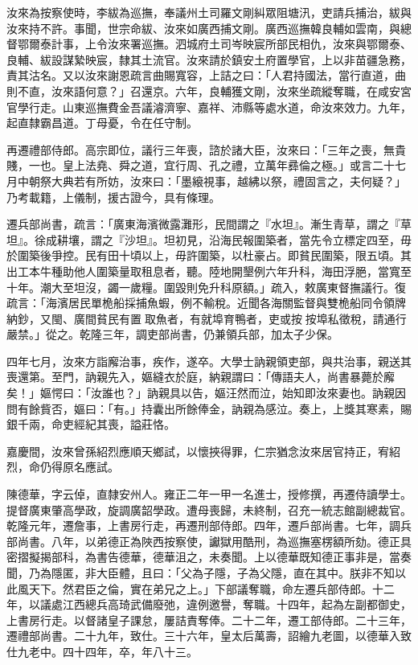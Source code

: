\begin{pinyinscope}
汝來為按察使時，李紱為巡撫，奉議州土司羅文剛糾眾阻塘汛，吏請兵捕治，紱與汝來持不許。事聞，世宗命紱、汝來如廣西捕文剛。廣西巡撫韓良輔如雲南，與總督鄂爾泰計事，上令汝來署巡撫。泗城府土司岑映宸所部民相仇，汝來與鄂爾泰、良輔、紱設謀縶映宸，隸其土流官。汝來請於鎮安土府置學官，上以非苗疆急務，責其沽名。又以汝來謝恩疏言曲賜寬容，上詰之曰：「人君持國法，當行直道，曲則不直，汝來語何意？」召還京。六年，良輔獲文剛，汝來坐疏縱奪職，在咸安宮官學行走。山東巡撫費金吾議濬濟寧、嘉祥、沛縣等處水道，命汝來效力。九年，起直隸霸昌道。丁母憂，令在任守制。

再遷禮部侍郎。高宗即位，議行三年喪，諮於諸大臣，汝來曰：「三年之喪，無貴賤，一也。皇上法堯、舜之道，宜行周、孔之禮，立萬年彞倫之極。」或言二十七月中朝祭大典若有所妨，汝來曰：「墨縗視事，越紼以祭，禮固言之，夫何疑？」乃考載籍，上儀制，援古證今，具有條理。

遷兵部尚書，疏言：「廣東海濱微露灘形，民間謂之『水坦』。漸生青草，謂之『草坦』。徐成耕壤，謂之『沙坦』。坦初見，沿海民報圍築者，當先令立標定四至，毋於圍築後爭控。民有田十頃以上，毋許圍築，以杜豪占。即貧民圍築，限五頃。其出工本牛種助他人圍築量取租息者，聽。陸地開墾例六年升科，海田浮脃，當寬至十年。潮大至坦沒，蠲一歲糧。圍毀則免升科原額。」疏入，敕廣東督撫議行。復疏言：「海濱居民單桅船採捕魚蝦，例不輸稅。近聞各海關監督與雙桅船同令領牌納鈔，又閩、廣間貧民有置𥭋取魚者，有就埠育鴨者，吏或按𥭋按埠私徵稅，請通行嚴禁。」從之。乾隆三年，調吏部尚書，仍兼領兵部，加太子少保。

四年七月，汝來方詣廨治事，疾作，遂卒。大學士訥親領吏部，與共治事，親送其喪還第。至門，訥親先入，嫗縫衣於庭，納親謂曰：「傳語夫人，尚書暴薨於廨矣！」嫗愕曰：「汝誰也？」訥親具以告，嫗汪然而泣，始知即汝來妻也。訥親因問有餘貲否，嫗曰：「有。」持囊出所餘俸金，訥親為感泣。奏上，上獎其寒素，賜銀千兩，命吏經紀其喪，謚莊恪。

嘉慶間，汝來曾孫紹烈應順天鄉試，以懷挾得罪，仁宗猶念汝來居官持正，宥紹烈，命仍得原名應試。

陳德華，字云倬，直隸安州人。雍正二年一甲一名進士，授修撰，再遷侍讀學士。提督廣東肇高學政，旋調廣韶學政。遭母喪歸，未終制，召充一統志館副總裁官。乾隆元年，遷詹事，上書房行走，再遷刑部侍郎。四年，遷戶部尚書。七年，調兵部尚書。八年，以弟德正為陜西按察使，讞獄用酷刑，為巡撫塞楞額所劾。德正具密摺擬揭部科，為書告德華，德華沮之，未奏聞。上以德華既知德正事非是，當奏聞，乃為隱匿，非大臣體，且曰：「父為子隱，子為父隱，直在其中。朕非不知以此風天下。然君臣之倫，實在弟兄之上。」下部議奪職，命左遷兵部侍郎。十二年，以議處江西總兵高琦武備廢弛，違例邀譽，奪職。十四年，起為左副都御史，上書房行走。以督諸皇子課怠，屢詰責奪俸。二十二年，遷工部侍郎。二十三年，遷禮部尚書。二十九年，致仕。三十六年，皇太后萬壽，詔繪九老圖，以德華入致仕九老中。四十四年，卒，年八十三。


\end{pinyinscope}
